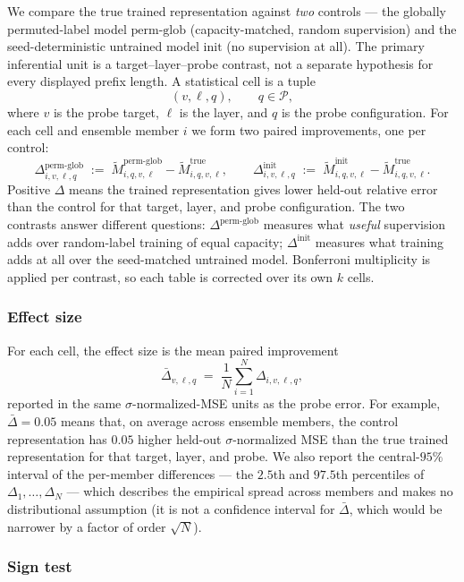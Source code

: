 \documentclass[11pt]{article}
\begin{document}
We compare the true trained representation against \emph{two} controls --- the globally permuted-label model $\mathrm{perm\text{-}glob}$ (capacity-matched, random supervision) and the seed-deterministic untrained model $\mathrm{init}$ (no supervision at all). The primary inferential unit is a target--layer--probe contrast, not a separate hypothesis for every displayed prefix length. A statistical cell is a tuple
\[
(v, \ell, q),
\qquad
q\in\mathcal{P},
\]
where $v$ is the probe target, $\ell$ is the layer, and $q$ is the probe configuration. For each cell and ensemble member $i$ we form two paired improvements, one per control:
\[
\Delta^{\mathrm{perm\text{-}glob}}_{i,v,\ell,q}
\;:=\;
\widetilde M^{\mathrm{perm\text{-}glob}}_{i,q,v,\ell}
-
\widetilde M^{\mathrm{true}}_{i,q,v,\ell},
\qquad
\Delta^{\mathrm{init}}_{i,v,\ell,q}
\;:=\;
\widetilde M^{\mathrm{init}}_{i,q,v,\ell}
-
\widetilde M^{\mathrm{true}}_{i,q,v,\ell}.
\]
Positive $\Delta$ means the trained representation gives lower held-out relative error than the control for that target, layer, and probe configuration. The two contrasts answer different questions: $\Delta^{\mathrm{perm\text{-}glob}}$ measures what \emph{useful} supervision adds over random-label training of equal capacity; $\Delta^{\mathrm{init}}$ measures what training adds at all over the seed-matched untrained model. Bonferroni multiplicity is applied per contrast, so each table is corrected over its own $k$ cells.

\subsubsection{Effect size}

For each cell, the effect size is the mean paired improvement
\[
\bar\Delta_{v,\ell,q}
\;=\;
\frac{1}{N}\sum_{i=1}^N \Delta_{i,v,\ell,q},
\]
reported in the same $\sigma$-normalized-MSE units as the probe error. For example, $\bar\Delta=0.05$ means that, on average across ensemble members, the control representation has $0.05$ higher held-out $\sigma$-normalized MSE than the true trained representation for that target, layer, and probe. We also report the central-$95\%$ interval of the per-member differences --- the $2.5$th and $97.5$th percentiles of $\Delta_1,\ldots,\Delta_N$ --- which describes the empirical spread across members and makes no distributional assumption (it is not a confidence interval for $\bar\Delta$, which would be narrower by a factor of order $\sqrt{N}$).

\subsubsection{Sign test}
\end{document}
